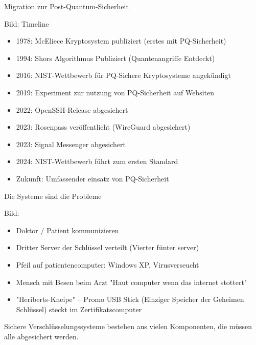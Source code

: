 
\begin{frame}[T]{Migration zur Post-Quantum-Sicherheit}

Bild: Timeline
\begin{itemize}
  \item 1978: McEliece Kryptosystem publiziert (erstes mit PQ-Sicherheit) 
  \item 1994: Shors Algorithmus Publiziert (Quantenangriffe Entdeckt) %
  \item 2016: NIST-Wettbewerb für PQ-Sichere Kryptosysteme angekündigt %
  \item 2019: Experiment zur nutzung von PQ-Sicherheit auf Websiten %
  \item 2022: OpenSSH-Release abgesichert %
  \item 2023: Rosenpass veröffentlicht (WireGuard abgesichert)
  \item 2023: Signal Messenger abgesichert %
  \item 2024: NIST-Wettbewerb führt zum ersten Standard %
  \item Zukunft: Umfassender einsatz von PQ-Sicherheit
\end{itemize}

\end{frame}

\begin{frame}[T]{Die Systeme sind die Probleme}

Bild:
\begin{itemize}
  \item Doktor / Patient kommunizieren
  \item Dritter Server der Schlüssel verteilt (Vierter fünter server)
  \item Pfeil auf patientencomputer: Windows XP, Virusverseucht
  \item Mensch mit Besen beim Arzt "Haut computer wenn das internet stottert"
  \item "Heriberts-Kneipe" – Promo USB Stick (Einziger Speicher der Geheimen Schlüssel) steckt im Zertifikatscomputer
\end{itemize}

Sichere Verschlüsselungssysteme bestehen aus vielen Komponenten,
die müssen alle abgesichert werden.
\end{frame}

